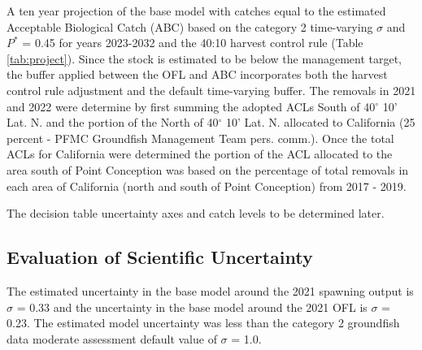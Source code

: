 \documentclass[11pt,
  english,
  a4paper,
]{article}
\begin{document}
A ten year projection of the base model with catches equal to the estimated Acceptable Biological Catch (ABC) based on the category 2 time-varying {\(\sigma\)\leavevmode\tagmcend\tagstructend} and {\(P^*\)\leavevmode\tagmcend\tagstructend} = 0.45 for years 2023-2032 and the 40:10 harvest control rule (Table \ref{tab:project}). Since the stock is estimated to be below the management target, the buffer applied between the OFL and ABC incorporates both the harvest control rule adjustment and the default time-varying buffer. The removals in 2021 and 2022 were determine by first summing the adopted ACLs South of 40{\(^\circ\)\leavevmode\tagmcend\tagstructend} 10' Lat. N. and the portion of the North of 40{\(^\circ\)\leavevmode\tagmcend\tagstructend} 10' Lat. N. allocated to California (25 percent - PFMC Groundfish Management Team pers. comm.). Once the total ACLs for California were determined the portion of the ACL allocated to the area south of Point Conception was based on the percentage of total removals in each area of California (north and south of Point Conception) from 2017 - 2019.

\leavevmode\tagmcend\tagstructend\par


The decision table uncertainty axes and catch levels to be determined later.

\leavevmode\tagmcend\tagstructend\par


\hypertarget{evaluation-of-scientific-uncertainty}{%
\subsection{Evaluation of Scientific Uncertainty}\label{evaluation-of-scientific-uncertainty}}

\leavevmode\tagmcend\tagstructend


The estimated uncertainty in the base model around the 2021 spawning output is {\(\sigma\)\leavevmode\tagmcend\tagstructend} = 0.33 and the uncertainty in the base model around the 2021 OFL is {\(\sigma\)\leavevmode\tagmcend\tagstructend} = 0.23. The estimated model uncertainty was less than the category 2 groundfish data moderate assessment default value of {\(\sigma\)\leavevmode\tagmcend\tagstructend} = 1.0.
\end{document}
